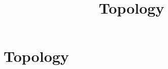 \documentclass[../../OAE-SPEC-MAIN.tex]{subfiles}
\title{Topology}\label{sec:topology}
\begin{document}
\chapter{Topology}










\end{document}
